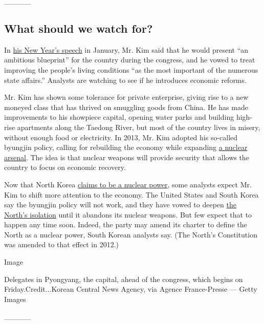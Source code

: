 \_\_\_\_\_

\hypertarget{what-should-we-watch-for}{%
\subsection{What should we watch for?}\label{what-should-we-watch-for}}

In
\href{http://www.nytimes3xbfgragh.onion/2016/01/02/world/asia/kim-jong-un-new-year-speech-north-korea.html}{his
New Year's speech} in January, Mr. Kim said that he would present ``an
ambitious blueprint'' for the country during the congress, and he vowed
to treat improving the people's living conditions ``as the most
important of the numerous state affairs.'' Analysts are watching to see
if he introduces economic reforms.

Mr. Kim has shown some tolerance for private enterprise, giving rise to
a new moneyed class that has thrived on smuggling goods from China. He
has made improvements to his showpiece capital, opening water parks and
building high-rise apartments along the Taedong River, but most of the
country lives in misery, without enough food or electricity. In 2013,
Mr. Kim adopted his so-called byungjin policy, calling for rebuilding
the economy while expanding
\href{http://www.nytimes3xbfgragh.onion/interactive/2016/01/06/world/asia/north-korea-nuclear-bomb-test.html}{a
nuclear arsenal}. The idea is that nuclear weapons will provide security
that allows the country to focus on economic recovery.

Now that North Korea
\href{http://www.nytimes3xbfgragh.onion/2016/01/07/magazine/kim-jong-uns-generational-ambitions.html}{claims
to be a nuclear power}, some analysts expect Mr. Kim to shift more
attention to the economy. The United States and South Korea say the
byungjin policy will not work, and they have vowed to deepen
\href{http://www.nytimes3xbfgragh.onion/interactive/2015/06/10/world/asia/north-korea-photos-video.html}{the
North's isolation} until it abandons its nuclear weapons. But few expect
that to happen any time soon. Indeed, the party may amend its charter to
define the North as a nuclear power, South Korean analysts say. (The
North's Constitution was amended to that effect in 2012.)

Image

Delegates in Pyongyang, the capital, ahead of the congress, which begins
on Friday.Credit...Korean Central News Agency, via Agence France-Presse
--- Getty Images

\_\_\_\_\_

